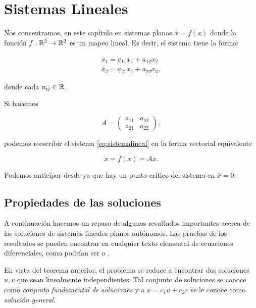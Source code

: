 \chapter{Sistemas Lineales}

Nos concentramos, en este capítulo en sistemas planos $\dot{x} = f(x)$ donde la función $f: {\mathbb{R}}^2 \to {\ensuremath{\mathbb{R}}}^2$ es un mapeo lineal. Es decir, el sistema tiene la forma:

\begin{equation} \label{eq:sistemalineal}
	\begin{array}{l}
		\dot{x_1} = a_{11}x_1 + a_{12}x_2 \\
		\dot{x_2} = a_{21}x_1 + a_{22}x_2,
	\end{array}
\end{equation}

donde cada $a_{ij} \in {\ensuremath{\mathbb{R}}}$.

Si hacemos

$$ A = \left(
\begin{array}{ll}
	a_{11} & a_{12} \\
	a_{21} & a_{22}
\end{array}
\right),
$$

podemos reescribir el sistema \ref{eq:sistemalineal} en la forma vectorial equivalente

\begin{equation} \label{eq:sistemalinealv}
	\dot{x} = f(x) = Ax.
\end{equation}

Podemos anticipar desde ya que hay un punto crítico del sistema en $\bar{x} = 0$.

\section{Propiedades de las soluciones}

A continuación hacemos un repaso de algunos resultados importantes acerca de las soluciones de sistemas lineales planos autónomos. Las pruebas de los resultados se pueden encontrar en cualquier texto elemental de ecuaciones diferenciales, como podrían ser \cite{zillcull} o \cite{boycediprima}.


En vista del teorema anterior, el problema se reduce a encontrar dos soluciones $u, v$ que sean linealmente independientes. Tal conjunto de soluciones se conoce como \emph{conjunto fundamental de soluciones} y a $x = c_1u + c_2v$ se le conoce como \textit{solución general}.

